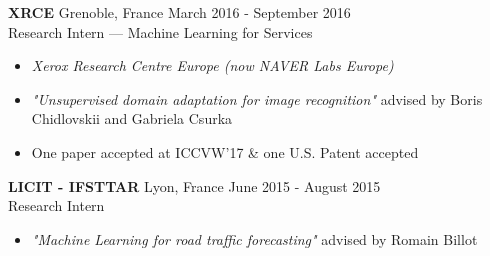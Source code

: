 \documentclass[10pt]{res} %
\begin{document}
\begin{resume}
\textbf{XRCE} \hfill Grenoble, France \hfill March 2016 - September 2016 \\
Research Intern --- Machine Learning for Services
\begin{itemize}
\item \textit{Xerox Research Centre Europe (now NAVER Labs Europe)}
\item \textit{"Unsupervised domain adaptation for image recognition"} advised by Boris Chidlovskii and Gabriela Csurka
\item One paper accepted at ICCVW'17 \& one U.S. Patent accepted
\end{itemize}

\textbf{LICIT - IFSTTAR} \hfill Lyon, France \hfill June 2015 - August 2015 \\
Research Intern
\begin{itemize}
\item \textit{"Machine Learning for road traffic forecasting"} advised by Romain Billot
\end{itemize}




\end{resume}
\end{document}
